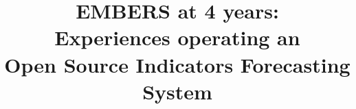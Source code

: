 \documentclass[11pt,a4paper,extrafontsizes,oneside]{article}
\begin{document}
\linespread{0.95}
\setlength{\parskip}{0pt}
\setlength{\parsep}{0pt}
\setlength{\topskip}{1pt}
\setlength{\topsep}{0pt}
\setlength{\partopsep}{0pt}





\makeatletter
\let\@copyrightspace\relax
\makeatother


%

\title{EMBERS at 4 years:\\
Experiences operating an \\
Open Source Indicators Forecasting System}
%
%
%
%
%
\end{document}
